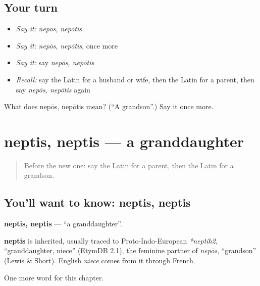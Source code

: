 \subsection*{Your turn}
\begin{itemize}
\raggedright
  \item \emph{Say it:} \emph{nepōs, nepōtis}
  \item \emph{Say it:} \emph{nepōs, nepōtis}, once more
  \item \emph{Say it:} say \emph{nepōs, nepōtis}
  \item \emph{Recall:} say the Latin for a husband or wife, then the Latin for a parent, then say \emph{nepōs, nepōtis} again
\end{itemize}

\begin{tcolorbox}[breakable,colback=teal!4,colframe=teal!35!black,title={Before you move on}]
What does nepōs, nepōtis mean? (\textquotedblleft{}A grandson\textquotedblright{}.) Say it once more.
\end{tcolorbox}
\section[neptis, neptis]{neptis, neptis — a granddaughter}

\label{lesson:LA-C273-neptis}



\begin{quote}
Before the new one: say the Latin for a parent, then the Latin for a grandson.
\end{quote}

\subsection*{You'll want to know: neptis, neptis}
\textbf{neptis, neptis} — \textquotedblleft{}a granddaughter\textquotedblright{}.

\begin{cousinweb}
\textbf{neptis} is inherited, usually traced to Proto-Indo-European \emph{*neptih2}, \textquotedblleft{}granddaughter, niece\textquotedblright{} (EtymDB 2.1), the feminine partner of \emph{nepōs}, \textquotedblleft{}grandson\textquotedblright{} (Lewis \& Short). English \emph{niece} comes from it through French.
\end{cousinweb}

\begin{grammarlens}[title={What you've built}]
One more word for this chapter.
\end{grammarlens}

